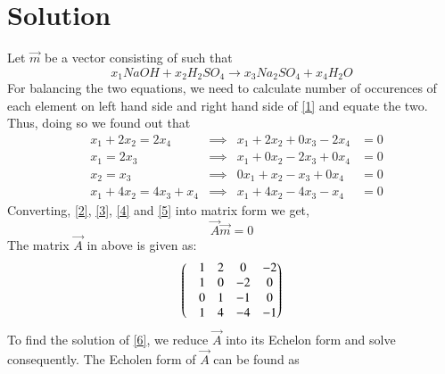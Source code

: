 \documentclass[journal,12pt,twocolumn]{IEEEtran}
\begin{document}
\section{Solution}
Let $\vec{m}$ be a vector consisting of  such that
\begin{equation}\label{1}
 x_1NaOH + x_2H_2SO_4 \xrightarrow{} x_3Na_2SO_4  +  x_4H_2O
\end{equation}
For balancing the two equations, we need to calculate number of occurences of each element on left hand side and right hand side of \ref{1} and equate the two. Thus, doing so we found out that
\begin{align}
& x_1 + 2x_2 = 2x_4 & \implies & x_1 + 2x_2 + 0x_3 - 2x_4 &= 0 \label{2} \\
& x_1 = 2x_3 & \implies & x_1 + 0x_2 - 2x_3 + 0x_4 &= 0 \label{3} \\
& x_2 = x_3 & \implies & 0x_1 + x_2 - x_3 + 0x_4 &= 0 \label{4} \\
& x_1 + 4x_2 = 4x_3 + x_4 & \implies & x_1 + 4x_2 - 4x_3 - x_4 &= 0 \label{5}
\end{align}
Converting, \ref{2}, \ref{3}, \ref{4} and \ref{5} into matrix form we get,
\begin{equation}\label{6}
	\vec{A}\vec{m} = 0
\end{equation}
The matrix $\vec{A}$ in above is given as:
\begin{equation}
	\begin{pmatrix}&1 &2 &0 &-2 \\ &1 &0 &-2 &0 \\ &0 &1 &-1 &0 \\&1 &4 &-4 &-1\end{pmatrix}
\end{equation}
To find the solution of \ref{6}, we reduce $\vec{A}$ into its Echelon form and solve consequently. The Echolen form of $\vec{A}$ can be found as
\end{document}
